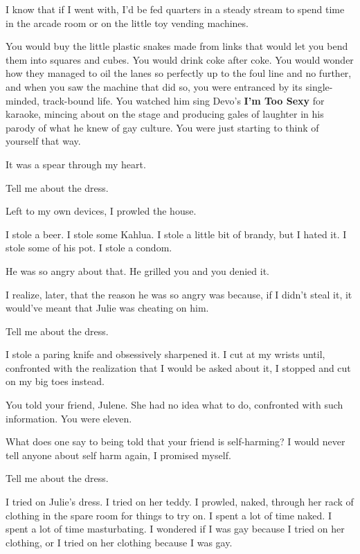 \begin{paracol}{2}
\begin{leftcolumn}
I know that if I went with, I'd be fed quarters in a steady stream to spend time in the arcade room or on the little toy vending machines.

\begin{ally}
You would buy the little plastic snakes made from links that would let you bend them into squares and cubes. You would drink coke after coke. You would wonder how they managed to oil the lanes so perfectly up to the foul line and no further, and when you saw the machine that did so, you were entranced by its single-minded, track-bound life. You watched him sing Devo's \textbf{I'm Too Sexy} for karaoke, mincing about on the stage and producing gales of laughter in his parody of what he knew of gay culture. You were just starting to think of yourself that way.
\end{ally}
It was a spear through my heart.

\begin{ally}
Tell me about the dress.
\end{ally}
Left to my own devices, I prowled the house.

I stole a beer. I stole some Kahlua. I stole a little bit of brandy, but I hated it. I stole some of his pot. I stole a condom.

\begin{ally}
He was so angry about that. He grilled you and you denied it.
\end{ally}
I realize, later, that the reason he was so angry was because, if I didn't steal it, it would've meant that Julie was cheating on him.

\begin{ally}
Tell me about the dress.
\end{ally}
I stole a paring knife and obsessively sharpened it. I cut at my wrists until, confronted with the realization that I would be asked about it, I stopped and cut on my big toes instead.

\begin{ally}
You told your friend, Julene. She had no idea what to do, confronted with such information. You were eleven.
\end{ally}
What does one say to being told that your friend is self-harming? I would never tell anyone about self harm again, I promised myself.

\begin{ally}
Tell me about the dress.
\end{ally}
I tried on Julie's dress. I tried on her teddy. I prowled, naked, through her rack of clothing in the spare room for things to try on. I spent a lot of time naked. I spent a lot of time masturbating. I wondered if I was gay because I tried on her clothing, or I tried on her clothing because I was gay.


\end{leftcolumn}
\end{paracol}
